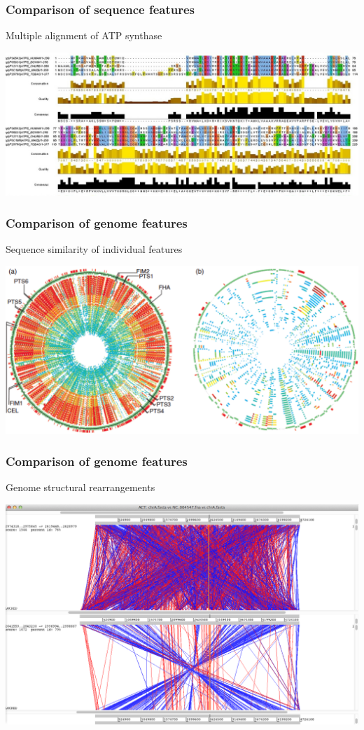 %
\begin{frame}
  \frametitle{Comparison of sequence features}
  Multiple alignment of ATP synthase \\
  \begin{center}
    \includegraphics[width=\textwidth]{images/atp_synthase_alignment}
  \end{center}  
\end{frame}

%
\begin{frame}
  \frametitle{Comparison of genome features}
  Sequence similarity of individual features \\
  \begin{center}
    \includegraphics[width=\textwidth]{images/salmonella_circular_comparison}
  \end{center}  
\end{frame}

%
\begin{frame}
  \frametitle{Comparison of genome features}
  Genome structural rearrangements \\
  \begin{center}
    \includegraphics[width=\textwidth]{images/act_rearrangement}
  \end{center}  
\end{frame}


